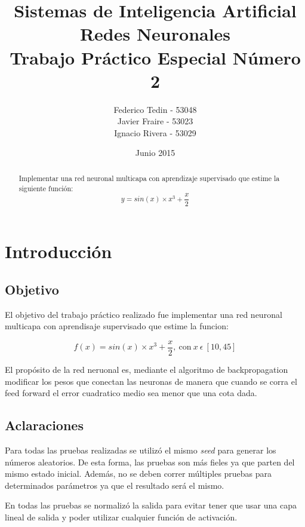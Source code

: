 \documentclass[11pt,a4paper]{article}
\title{Sistemas de Inteligencia Artificial\\Redes Neuronales\\Trabajo Práctico Especial Número 2}
\date{Junio 2015}
\author{Federico Tedin - 53048\\Javier Fraire - 53023\\Ignacio Rivera - 53029}
\begin{document}
\maketitle
\thispagestyle{empty}

\vspace{5mm}
\renewcommand{\abstractname}{Resumen:}
\begin{abstract}

\centering
Implementar una red neuronal multicapa con aprendizaje supervisado que estime la siguiente función:
$$ y = sin(x) \times x^3 + \frac{x}{2} $$
\end{abstract}

\clearpage

\renewcommand{\contentsname}{Índice}
\tableofcontents
\thispagestyle{empty}
\clearpage
\setcounter{page}{1}

\section{Introducción}
\subsection{Objetivo}

El objetivo del trabajo práctico realizado fue implementar una red neuronal multicapa con aprendisaje supervisado que estime la funcion:

$$ f(x) = sin(x) \times x^3 + \frac{x}{2}, \ \text{con} \ x \ \epsilon \ [10, 45] $$

El propósito de la red neruonal es, mediante el algoritmo de backpropagation modificar los pesos que conectan las neuronas de manera que cuando se corra el feed forward el error cuadratico medio sea menor que una cota dada.

\subsection{Aclaraciones}

Para todas las pruebas realizadas se utilizó el mismo \emph{seed} para generar los números aleatorios. De esta forma, las pruebas son más fieles ya que parten del mismo estado inicial. Además, no se deben correr múltiples pruebas para determinados parámetros ya que el resultado será el mismo. 

En todas las pruebas se normalizó la salida para evitar tener que usar una capa lineal de salida y poder utilizar cualquier función de activación.
\end{document}
